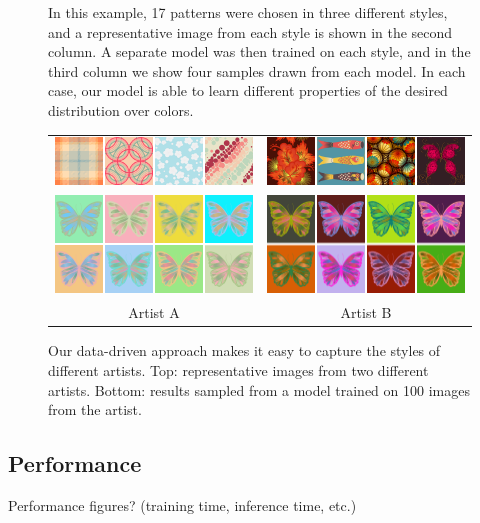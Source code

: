\begin{figure}[ht]
\caption{In this example, 17 patterns were chosen in three different styles, and a representative image from each style is shown in the second column. A separate model was then trained on each style, and in the third column we show four samples drawn from each model. In each case, our model is able to learn different properties of the desired distribution over colors.}
\label{fig:styleTraining}
\vspace{-1.0em}
\end{figure}

\begin{figure}[ht]
\begin{tabular}{cc} 
\includegraphics[width=.48\linewidth]{figs/styleSugarExamples}&\includegraphics[width=.48\linewidth]{figs/styleAlbenajExamples}\vspace{1.0em}\\
\includegraphics[width=.48\linewidth]{figs/styleSugar}&\includegraphics[width=.48\linewidth]{figs/styleAlbenaj}\\
Artist A&Artist B\\
\end{tabular}

\caption{Our data-driven approach makes it easy to capture the styles of different artists. Top: representative images from two different artists. Bottom: results sampled from a model trained on 100 images from the artist.}
\vspace{-1.0em}
\end{figure}

\subsection{Performance}

Performance figures? (training time, inference time, etc.)